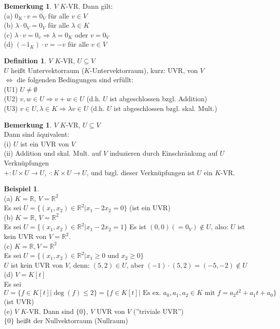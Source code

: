 \documentclass[10pt,a4paper,numbers=endperiod]{scrartcl}
\theoremstyle{definition}
\newtheorem{defi}[satz]{Definition}
\newtheorem{bem}[satz]{Bemerkung}
\newtheorem{bsp}[satz]{Beispiel}
\begin{document}
\begin{bem}
	$V$ $K$-VR. Dann gilt:\\
	(a) $0_K \cdot v = 0_V$ für alle $v \in V$\\
	(b) $\lambda \cdot 0_V = 0_V$ für alle $\lambda \in K$\\
	(c) $\lambda \cdot v = 0_v \Rightarrow \lambda = 0_K$ oder $v=0_V$\\
	(d) $(-1_K) \cdot v = -v$ für alle $v \in V$
\end{bem}

\begin{defi}
	$V$ $K$-VR, $U \subseteq V$\\
	$U$ heißt Untervektorraum ($K$-Untervektorraum), kurz: UVR, von $V$\\ $\Leftrightarrow$ die folgenden Bedingungen sind erfüllt:\\
	(U1) $U \neq \emptyset$\\
	(U2) $v,w \in U \Rightarrow v+w \in U$ (d.h. $U$ ist abgeschlossen bzgl. Addition)\\
	(U3) $v \in U, \lambda \in K \Rightarrow \lambda v \in U$ (d.h. $U$ ist abgeschlossen bzgl. skal. Mult.)
\end{defi}
\newpage
\begin{bem}
	$V$ $K$-VR, $U \subseteq V$\\
	Dann sind äquivalent:\\
	(i) $U$ ist ein UVR von $V$\\
	(ii) Addition und skal. Mult. auf $V$ induzieren durch Einschränkung auf $U$ Verknüpfungen\\ $+: U \times U \rightarrow U$, $\cdot: K \times U \rightarrow U$, und bzgl. dieser Verknüpfungen ist $U$ ein $K$-VR.
\end{bem}

\begin{bsp}
	$ $\\
	(a) $K = \mathbb{R}$, $V= \mathbb{R}^2$\\
	Es sei $U=\{(x_1,x_2) \in \mathbb{R}^2| x_1 - 2x_2 = 0\}$ (ist ein UVR)\\
	(b) $K=\mathbb{R}$, $V=\mathbb{R}^2$\\
	Es sei $U = \{(x_1, x_2) \in \mathbb{R}^2| x_1 - 2x_2 = 1\}$
	Es ist $(0,0) (=0_V) \notin U$, also: $U$ ist kein UVR von $V=\mathbb{R}^2$.\\
	(c) $K=\mathbb{R}, V=\mathbb{R}^2$\\
	Es sei $U=\{(x_1,x_2) \in \mathbb{R}^2| x_1 \geq 0 \text{ und } x_2 \geq 0\}$\\
	$U$ ist kein UVR von $V$, denn: $(5,2) \in U$, aber $(-1) \cdot (5,2) = (-5,-2) \notin U$\\
	(d) $V = K[t]$\\
	Es sei $U = \{f \in K[t]| \deg(f) \leq 2\} = \{f \in K[t]| \text{ Es ex. } a_0,a_1,a_2 \in K \text{ mit } f= a_2t^2+a_1t+a_0\}$ (ist UVR)\\
	(e) $V$ $K$-VR. Dann sind $\{0\}$, $V$ UVR von $V$ (''triviale UVR'')\\
	$\{0\}$ heißt der Nullvektorraum (Nullraum)
\end{bsp}
\end{document}
